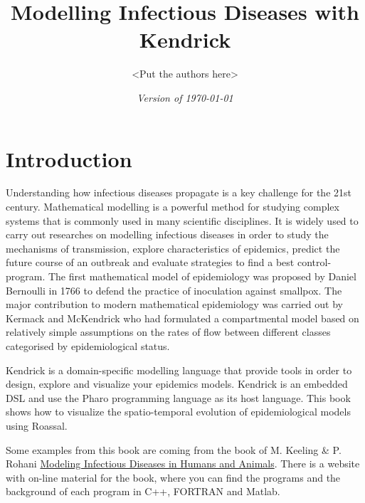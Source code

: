 \documentclass[a4paper,10pt,twoside]{book}
\begin{document}
\frontmatter
\setcounter{page}{1}
\pagestyle{headings}
\author{
  <Put the authors here>
}
\title{\Huge\bf {Modelling Infectious Diseases with Kendrick} }
\isodate
\date{\emph{Version of \today}}
\maketitle
\tableofcontents

\sloppy %
\mainmatter

\chapter{ Introduction}
Understanding how infectious diseases propagate is a key challenge for the 21st century. Mathematical modelling is a powerful method for studying complex systems that is commonly used in many scientific disciplines. It is widely used to carry out researches on modelling infectious diseases in order to study the mechanisms of transmission, explore characteristics of epidemics, predict the future course of an outbreak and evaluate strategies to find a best control-program. The first mathematical model of epidemiology was proposed by Daniel Bernoulli in 1766 to defend the practice of inoculation against smallpox. The major contribution to modern mathematical epidemiology was carried out by Kermack and McKendrick who had formulated a compartmental model based on relatively simple assumptions on the rates of flow between different classes categorised by epidemiological status.

Kendrick is a domain-specific modelling language that provide tools in order to design, explore and visualize your epidemics models. Kendrick is an embedded DSL and use the Pharo programming language as its host language. This book shows how to visualize
the spatio-temporal evolution of epidemiological models using Roassal.

Some examples from this book are coming from the book of M. Keeling \& P. Rohani \href{http://press.princeton.edu/titles/8459.html}{Modeling Infectious Diseases in Humans and Animals}.
There is a website with on-line material for the book, where you can find the programs and the background of each program in C++, FORTRAN and Matlab.
\end{document}
